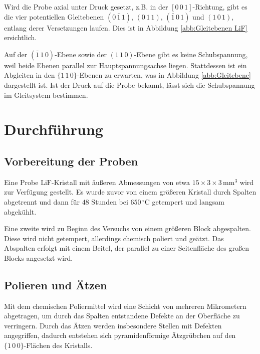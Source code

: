 \documentclass[12pt,a4paper]{scrartcl}
\numberwithin{equation}{section} %
\renewcommand{\[}{} %
\renewcommand{\]}{\noindent} %
\begin{document}
Wird die Probe axial unter Druck gesetzt, z.B. in der
\([0\,0\,1]\)-Richtung, gibt es die vier potentiellen Gleitebenen
\((0\,\bar{1}\,1)\), \((0\,1\,1)\), \((\bar{1}\,0\,1)\) und
\((1\,0\,1)\), entlang derer Versetzungen laufen. Dies ist in Abbildung
\ref{abb:Gleitebenen LiF} ersichtlich.

Auf der \((\bar{1}\,1\,0)\)-Ebene sowie der \((1\,1\,0)\)-Ebene gibt es
keine Schubspannung, weil beide Ebenen parallel zur Hauptspannungsachse
liegen. Stattdessen ist ein Abgleiten in den \(\lbrace1\,1\,0\rbrace\)-Ebenen zu erwarten, was in Abbildung \ref{abb:Gleitebene} dargestellt ist. Ist der Druck auf die Probe bekannt, lässt sich die Schubspannung im Gleitsystem bestimmen.

\clearpage
\hypertarget{durchfuxfchrung}{%
\section{Durchführung}\label{durchfuxfchrung}}

\hypertarget{vorbereitung-der-proben}{%
\subsection{Vorbereitung der Proben}\label{vorbereitung-der-proben}}

Eine Probe \(\mathrm{LiF}\)-Kristall mit äußeren Abmessungen von etwa
\(15 \times 3 \times 3 \,\mathrm{mm^3}\) wird zur Verfügung gestellt. Es
wurde zuvor von einem größeren Kristall durch Spalten abgetrennt und
dann für \(48\) Stunden bei \(650\,^\circ\mathrm C\) getempert und
langsam abgekühlt.

Eine zweite wird zu Beginn des Versuchs von einem größeren Block
abgespalten. Diese wird nicht getempert, allerdings chemisch poliert und
geätzt. Das Abspalten erfolgt mit einem Beitel, der parallel zu einer
Seitenfläche des großen Blocks angesetzt wird.

\hypertarget{polieren-und-uxe4tzen}{%
\subsection{Polieren und Ätzen}\label{polieren-und-uxe4tzen}}

Mit dem chemischen Poliermittel wird eine Schicht von mehreren
Mikrometern abgetragen, um durch das Spalten entstandene Defekte an der
Oberfläche zu verringern. Durch das Ätzen werden insbesondere Stellen
mit Defekten angegriffen, dadurch entstehen sich pyramidenförmige
Ätzgrübchen auf den \(\{1\,0\,0\}\)-Flächen des Kristalls.
\end{document}
